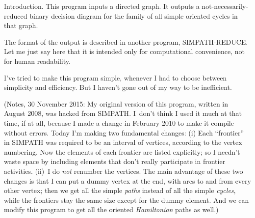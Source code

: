 
\datethis




Introduction. This program inputs a directed graph.
It outputs a not-necessarily-reduced binary decision diagram
for the family of all simple oriented cycles in that graph.

The format of the output is described in another program,
{\mc SIMPATH-REDUCE}. Let me just say here that it is intended
only for computational convenience, not for human readability.

I've tried to make this program simple, whenever I had to
choose between simplicity and efficiency. But I haven't gone
out of my way to be inefficient.

(Notes, 30 November 2015: My original version of this program,
written in August 2008, was hacked from {\mc SIMPATH}. I~don't
think I used it much at that time, if at all, because
I made a change in February 2010 to make it compile without
errors. Today I'm making two fundamental changes:
(i) Each ``frontier'' in {\mc SIMPATH} was required
to be an interval of vertices, according to the vertex numbering.
Now the elements of each frontier are listed explicitly; so
I needn't waste space by including elements that don't really
participate in frontier activities. (ii)~I do {\it not\/}
renumber the vertices.
The main advantage of these two changes is
that I can put a dummy vertex at the end, with arcs to and from
every other vertex; then we get all the simple {\it paths\/} instead
of all the simple {\it cycles}, while the frontiers stay the same size
except for the dummy element. And we can modify this program to get all
the oriented {\it Hamiltonian\/} paths as well.)

